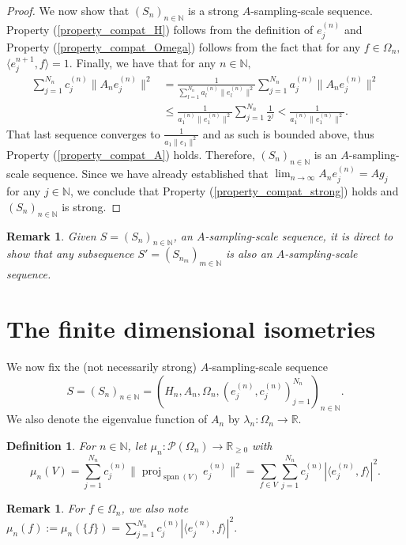 \documentclass[10pt,a4paper]{amsart}
\newtheorem{definition}[thm]{Definition}
\newtheorem{remark}[thm]{Remark}
\def \Proj{\operatorname{proj}}
\def \Span{\operatorname{span}}
\def \LL{\langle}
\def \RR{\rangle}
\begin{document}
\begin{proof}
	We now show that $(S_n)_{n\in\mathbb{N}}$ is a strong $A$-sampling-scale sequence. Property (\ref{property_compat_H}) follows from the definition of $e_j^{(n)}$ and Property (\ref{property_compat_Omega}) follows from the fact that for any $f\in\Omega_n,$ $\LL e_j^{n+1}, f\RR=1.$ Finally, we have that  for any $n\in\mathbb{N},$
	\begin{align*}
		\sum_{j=1}^{N_n} c_j^{(n)}\|A_ne_j^{(n)}\|^2&=\frac{1}{\sum_{l=1}^{N_n}a_l^{(n)}\|e_l^{(n)}\|^2}\sum_{j=1}^{N_n}a_j^{(n)}\|A_ne_j^{(n)}\|^2\\
		&\leq \frac{1}{a_1^{(n)}\|e_1^{(n)}\|^2}\sum_{j=1}^{N_n}\frac{1}{2^j}<\frac{1}{a_1^{(n)}\|e_1^{(n)}\|^2}.
	\end{align*}
	That last sequence converges to $\frac{1}{a_1\|e_1\|^2}$ and as such is bounded above, thus Property (\ref{property_compat_A}) holds. Therefore, $(S_n)_{n\in\mathbb{N}}$ is an $A$-sampling-scale sequence. Since we have already established that $\lim_{n\rightarrow\infty} A_ne_j^{(n)}=A g_j$ for any $j\in\mathbb{N}$, we conclude that Property (\ref{property_compat_strong}) holds and $(S_n)_{n\in\mathbb{N}}$ is strong.
\end{proof}
\begin{remark}\label{remark_sampling_scale_subsequences}
	Given $S=(S_n)_{n\in\mathbb{N}}$, an $A$-sampling-scale sequence, it is direct to show that any subsequence $S'=(S_{n_m})_{m\in\mathbb{N}}$ is also an $A$-sampling-scale sequence.
\end{remark}
\section{The finite dimensional isometries}

We now fix the (not necessarily strong) $A$-sampling-scale sequence $$S=(S_n)_{n\in\mathbb{N}}=(H_n,A_n,\Omega_n,(e_j^{(n)},c_j^{(n)})_{j=1}^{N_n})_{n\in\mathbb{N}}.$$ We also denote the eigenvalue function of $A_n$ by $\lambda_n:\Omega_n\rightarrow \mathbb{R}.$
\begin{definition}
	For $n\in\mathbb{N}$, let $\mu_n:\mathcal{P}(\Omega_n)\rightarrow\mathbb{R}_{\geq 0}$ with $$\mu_n(V)=\sum_{j=1}^{N_n} c_j^{(n)}\|\Proj_{\Span(V)}e_j^{(n)}\|^2=\sum_{f\in V}\sum_{j=1}^{N_n}c_j^{(n)}|\langle e_j^{(n)}, f\rangle|^2. $$
\end{definition}
\begin{remark}
	For $f\in\Omega_n$, we also note $\mu_n(f):=\mu_n(\{f\})=\sum_{j=1}^{N_n}c_j^{(n)}|\langle e_j^{(n)}, f\rangle|^2.$
\end{remark}
\end{document}
